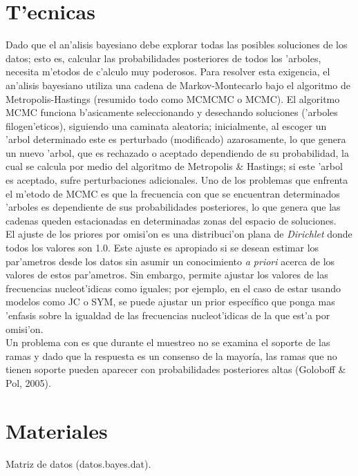 \section{T'ecnicas}
Dado que el an'alisis bayesiano debe explorar todas las posibles soluciones de los datos; esto es, calcular las probabilidades posteriores de todos los 'arboles, necesita m'etodos de c'alculo muy poderosos. Para resolver esta exigencia, el an'alisis bayesiano utiliza una cadena de Markov-Montecarlo bajo el algoritmo de
Metropolis-Hastings (resumido todo como MCMCMC o MCMC). El algoritmo MCMC funciona b'asicamente seleccionando y desechando 
soluciones ('arboles filogen'eticos), siguiendo una caminata aleatoria; 
inicialmente, al escoger un 'arbol determinado este es perturbado (modificado)
azarosamente, lo que genera un nuevo 'arbol, que es rechazado o aceptado dependiendo de su probabilidad, la cual se calcula por medio del algoritmo de Metropolis \& Hastings; si este 'arbol es aceptado, sufre perturbaciones adicionales. Uno de los problemas que enfrenta el m'etodo de MCMC es que la frecuencia con que se encuentran  determinados 'arboles es dependiente de sus probabilidades posteriores, lo que genera que las cadenas queden estacionadas en determinadas zonas del espacio de soluciones.\\
El ajuste de los priores por omisi'on es una distribuci'on plana de \textit{Dirichlet} donde todos los valores son 1.0. Este ajuste es apropiado si se desean estimar los par'ametros desde los datos sin asumir un conocimiento \textit{a priori} acerca de los valores de estos par'ametros. Sin embargo,   permite ajustar los valores de las frecuencias nucleot'idicas como iguales; por ejemplo, en el caso de estar usando modelos como JC o SYM, se puede ajustar un prior espec\'ifico que ponga mas 'enfasis sobre la igualdad de las frecuencias nucleot'idicas de la que est'a por omisi'on.\\
Un problema con  es que durante el muestreo no se examina el soporte de las ramas y dado que la respuesta es un consenso de la mayor\'ia, las ramas que no tienen soporte pueden aparecer con probabilidades posteriores altas (Goloboff \& Pol, 2005).
\section{Materiales}
\noindent
Matriz de datos (datos.bayes.dat).\\
